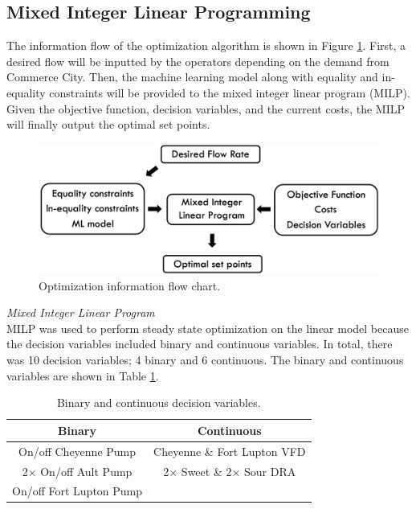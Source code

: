 \subsection{Mixed Integer Linear Programming}
The information flow of the optimization algorithm is shown in Figure \ref{fig:08Optimization_flow}.  First, a desired flow will be inputted by the operators depending on the demand from Commerce City.  Then, the machine learning model along with equality and in-equality constraints will be provided to the mixed integer linear program (MILP).  Given the objective function, decision variables, and the current costs, the MILP will finally output the optimal set points.
\begin{figure}[h]
    \centering
    \includegraphics[width=\textwidth]{images/08Optimization_flow.png}
    \caption{Optimization information flow chart.}
    \label{fig:08Optimization_flow}
\end{figure}

\noindent
\textit{Mixed Integer Linear Program} \\
MILP was used to perform steady state optimization on the linear model because the decision variables included binary and continuous variables.  In total, there was 10 decision variables; 4 binary and 6 continuous.  The binary and continuous variables are shown in Table \ref{tab:08binary_cont}.

\begin{table}[h]
    \centering
    {
    \begin{tabular}{ c | c }
        Binary                       &  Continuous           \\
        \hline
        On/off Cheyenne Pump               &  Cheyenne \& Fort Lupton VFD            \\
        2$\times$ On/off Ault Pump         &  2$\times$ Sweet \& 2$\times$ Sour DRA  \\
        On/off Fort Lupton Pump
    \end{tabular}}
    \caption{Binary and continuous decision variables.}
    \label{tab:08binary_cont}
\end{table}

